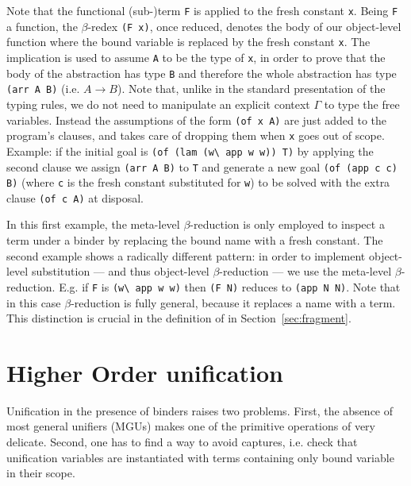 \documentclass{llncs}
\begin{document}
Note that the functional (sub-)term
\verb+F+ is applied to the fresh constant \verb+x+.  Being \verb+F+ a
function, the $\beta$-redex \verb+(F x)+, once reduced, denotes the body of
our object-level function where the bound variable is replaced by the fresh
constant \verb+x+.
The implication is used to
assume \verb+A+ to be the type of \verb+x+, in order to prove that the body of
the abstraction has type \verb+B+ and therefore the whole abstraction has type
\verb+(arr A B)+ (i.e. $A \to B$). Note that, unlike in
the standard presentation of the typing rules, we do not need to manipulate an
explicit context $\Gamma$ to type the free variables. Instead the assumptions
of the form \verb+(of x A)+ are just added to the program's clauses, and \lp{}
takes care of dropping them when \verb+x+ goes out of scope.
Example: if the initial goal is
\verb+(of (lam (w\ app w w)) T)+ by applying the second clause we assign
\verb+(arr A B)+ to \verb+T+ and generate
a new goal \verb+(of (app c c) B)+ (where \verb+c+ is the fresh constant
substituted for \verb+w+) to be solved with the extra clause \verb+(of c A)+
at disposal.

In this first example, the meta-level $\beta$-reduction is only employed
to inspect a term under a binder by replacing the bound name with a fresh
constant.  The second example
shows a radically different pattern: in order to implement object-level
substitution --- and thus object-level $\beta$-reduction --- we use the
meta-level $\beta$-reduction. E.g. if \verb+F+ is \verb+(w\ app w w)+
then \verb+(F N)+ reduces to \verb+(app N N)+.  Note that in this case
$\beta$-reduction is fully general, because it replaces a name with a term.
This distinction is crucial in the definition of \rff{} in
Section~\ref{sec:fragment}.

\section{Higher Order unification}%
\label{sec:ho}

Unification in the presence of binders raises two %
problems. First, the absence of most general unifiers (MGUs) makes
one of the primitive operations of \lp{} very delicate.  Second, one has
to find a way to avoid captures, i.e. check that unification variables
are instantiated with terms containing only bound variable in their scope.
\end{document}
